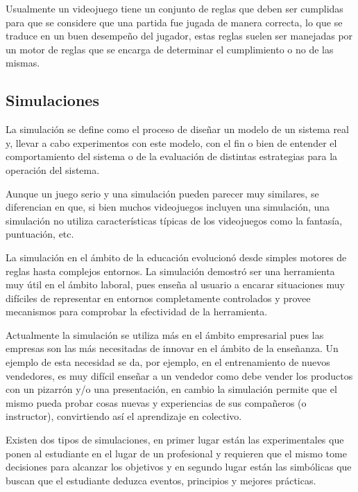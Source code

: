 
Usualmente un videojuego tiene un conjunto de reglas que deben ser cumplidas para 
que se considere que una partida fue jugada de manera correcta, lo que se traduce 
en un buen desempeño del jugador, estas reglas suelen ser manejadas
por un motor de reglas que se encarga de determinar el cumplimiento o no de las mismas.

\subsection{Simulaciones}

La simulación se define como el proceso de diseñar un modelo de un sistema real
y, llevar a cabo experimentos con este modelo, con el fin o bien de entender el
comportamiento del sistema o de la evaluación de distintas estrategias para la
operación del sistema\cite{ingalls2008introduction}. 

Aunque un juego serio y una simulación pueden parecer muy similares, se
diferencian en que, si bien muchos videojuegos incluyen una simulación, una
simulación no utiliza características típicas de los videojuegos como la
fantasía, puntuación, etc\cite{sg:aoverview}.

La simulación en el ámbito de la educación evolucionó desde simples motores de
reglas hasta complejos entornos. La simulación demostró ser una herramienta muy
útil en el ámbito laboral\cite{mariluz:seiousgames}, pues enseña al usuario a
encarar situaciones muy difíciles de representar en entornos completamente
controlados y provee mecanismos para comprobar la efectividad de la herramienta. 

Actualmente la simulación se utiliza más en el ámbito empresarial pues las
empresas son las más necesitadas de innovar en el ámbito de la enseñanza. Un
ejemplo de esta necesidad se da, por ejemplo, en el entrenamiento de nuevos
vendedores, es muy difícil enseñar a un vendedor como debe vender los productos
con un pizarrón y/o una presentación, en cambio la simulación permite que el
mismo pueda probar cosas nuevas y experiencias de sus compañeros (o instructor),
convirtiendo así el aprendizaje en colectivo\cite{mariluz:seiousgames}.

Existen dos tipos de simulaciones, en primer lugar están las experimentales que
ponen al estudiante en el lugar de un profesional y requieren que el mismo tome
decisiones para alcanzar los objetivos y en segundo lugar están las simbólicas
que buscan que el estudiante deduzca eventos, principios y mejores
prácticas\cite{charsky:2010}. 

